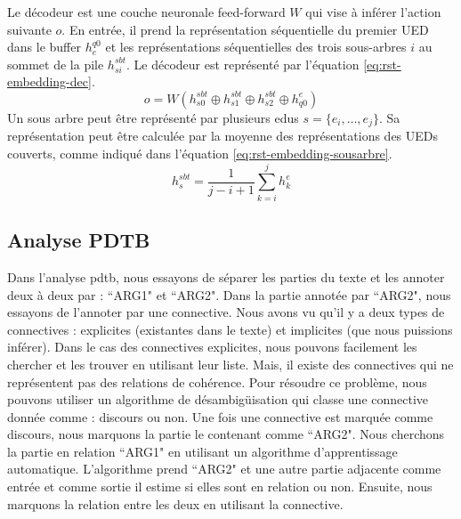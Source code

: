 \documentclass{KodeBook}
\begin{document}
Le décodeur est une couche neuronale feed-forward $W$ qui vise à inférer l'action suivante $o$. 
En entrée, il prend la représentation séquentielle du premier UED dans le buffer $ h_{e}^{q0} $ et les représentations séquentielles des trois sous-arbres $i$ au sommet de la pile $h_{si}^{sbt}$. 
Le décodeur est représenté par l'équation \ref{eq:rst-embedding-dec}. 
\begin{equation}\label{eq:rst-embedding-dec}
o = W(h_{s0}^{sbt} \oplus h_{s1}^{sbt} \oplus h_{s2}^{sbt} \oplus h_{q0}^{e})
\end{equation}
Un sous arbre peut être représenté par plusieurs \ac{edu}s $ s= \{e_i, \ldots, e_j\}$. 
Sa représentation peut être calculée par la moyenne des représentations des UEDs couverts, comme indiqué dans l'équation \ref{eq:rst-embedding-sousarbre}. 
\begin{equation}\label{eq:rst-embedding-sousarbre}
h_{s}^{sbt} = \frac{1}{j-i+1} \sum_{k=i}^{j} h_k^e
\end{equation}

\subsection{Analyse PDTB}

Dans l'analyse \ac{pdtb}, nous essayons de séparer les parties du texte et les annoter deux à deux par : ``ARG1" et ``ARG2". 
Dans la partie annotée par ``ARG2", nous essayons de l'annoter par une connective. 
Nous avons vu qu'il y a deux types de connectives : explicites (existantes dans le texte) et implicites (que nous puissions inférer). 
Dans le cas des connectives explicites, nous pouvons facilement les chercher et les trouver en utilisant leur liste. 
Mais, il existe des connectives qui ne représentent pas des relations de cohérence. 
Pour résoudre ce problème, nous pouvons utiliser un algorithme de désambigüisation qui classe une connective donnée comme : discours ou non. 
Une fois une connective est marquée comme discours, nous marquons la partie le contenant comme ``ARG2". 
Nous cherchons la partie en relation ``ARG1" en utilisant un algorithme d'apprentissage automatique. 
L'algorithme prend ``ARG2" et une autre partie adjacente comme entrée et comme sortie il estime si elles sont en relation ou non. 
Ensuite, nous marquons la relation entre les deux en utilisant la connective. 
\end{document}
